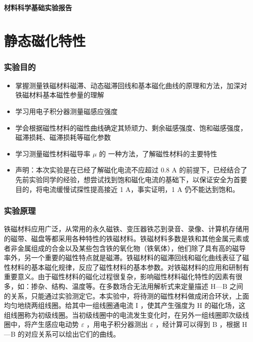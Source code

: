 \documentclass[a4paper,utf8]{article}
\begin{document}
\begin{center}
    {\mbox{}\\[7em]\bfseries\songti%
    材料科学基础实验报告}\\[34mm]
    \pointingbox
\end{center}\newpage
\part{静态磁化特性}
\section{实验目的}
    \begin{itemize}
        \item 掌握测量铁磁材料磁滞、动态磁滞回线和基本磁化曲线的原理和方法，加深对铁磁材料基本磁性参量的理解 
        \item 学习用电子积分器测量磁感应强度
        \item 学会根据磁性材料的磁性曲线确定其矫顽力、剩余磁感强度、饱和磁感强度，磁滞损耗、磁滞损耗等磁化参数
        \item 学习测量磁性材料磁导率 $\mu$ 的 一种方法，了解磁性材料的主要特性
        \item 声明：本次实验是在已经了解磁化电流不应超过 0.8 A 的前提下，已经结合了先前实验同学的经验，想尝试找到饱和磁化电流的基础下，以保证安全为首要目的，将电流缓慢试探性提高接近 1 A，事实证明，1 A 仍不能达到饱和。
    \end{itemize}
\section{实验原理}%
    铁磁材料应用广泛，从常用的永久磁铁、变压器铁芯到录音、录像、计算机存储用的磁带、磁盘等都采用各种特性的铁磁材料。铁磁材料多数是铁和其他金属元素或者非金属组成的合金以及某些包含铁的氧化物（铁氧体），他们除了具有高的磁导率外，另一个重要的磁性特点就是磁滞。铁磁材料的磁滞回线和磁化曲线表征了磁性材料的基本磁化规律，反应了磁性材料的基本参数。对铁磁材料的应用和研制有重要意义。由于磁性材料的磁化过程很复杂，影响磁性材料磁化特性的因素有很多，如：掺杂、结构、温度等。在多数场合无法用解析式来定量描述 H—B 之间的关系，只能通过实验测定它。本实验中，将待测的磁性材料做成闭合环状，上面均匀地绕两组线圈。给其中一组线圈通电流 I ，使其产生强度为 H 的磁化场，这组线圈称为初级线圈。当初级线圈中的电流发生变化时，在另外一组线圈即次级线圈中，将产生感应电动势 $\varepsilon$ ，用电子积分器测出 $\varepsilon$ ，经计算可以得到 B ，根据 H—B 的对应关系可以绘出它们的曲线。
\end{document}
